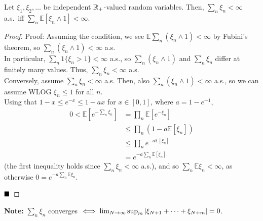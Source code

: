 \begin{lemma}
    Let $\xi_1, \xi_2, \ldots$ be independent $\mathbb{R}_{+}$-valued random variables. Then, $\sum_n \xi_n < \infty$ a.s.\ iff $\sum_n \mathbb{E}[\xi_n \wedge 1] < \infty$.
\end{lemma}
\begin{proof}{Proof:}
    Assuming the condition, we see $\mathbb{E}\sum_n(\xi_n \wedge 1) < \infty$ by Fubini's theorem, so $\sum_n(\xi_n \wedge 1) < \infty$ a.s.\\

    In particular, $\sum_n 1\{\xi_n > 1\} < \infty$ a.s., so $\sum_n(\xi_n \wedge 1)$ and $\sum_n \xi_n$ differ at finitely many values. Thus, $\sum_n \xi_n < \infty$ a.s.\\

    Conversely, assume $\sum_n \xi_n < \infty$ a.s. Then, also $\sum_n(\xi_n \wedge 1) < \infty$ a.s., so we can assume WLOG $\xi_n \leq 1$ for all $n$.\\

    Using that $1 - x \leq e^{-x} \leq 1 - ax$ for $x \in [0, 1]$, where $a = 1 - e^{-1}$,
    \begin{align*}
        0 < \mathbb{E}\left[e^{-\sum_n \xi_n}\right] &= \prod_n \mathbb{E}[e^{-\xi_n}]\\
        &\leq \prod_n(1 - a\mathbb{E}[\xi_n])\\
        &\leq \prod_n e^{-a\mathbb{E}[\xi_n]}\\
        &= e^{-a\sum_n \mathbb{E}[\xi_n]}
    \end{align*}
    (the first inequality holds since $\sum_n \xi_n < \infty$ a.s.), and so $\sum_n \mathbb{E}\xi_n < \infty$, as otherwise $0 = e^{-a\sum_n \mathbb{E}\xi_n}$.

    $\qed$
\end{proof}

\textbf{Note:} $\sum_n \xi_n$ converges $\iff \lim_{N \to \infty} \sup_{m} \left\lvert {\xi_{N + 1} + \cdots + \xi_{N + m}} \right\rvert = 0$.

